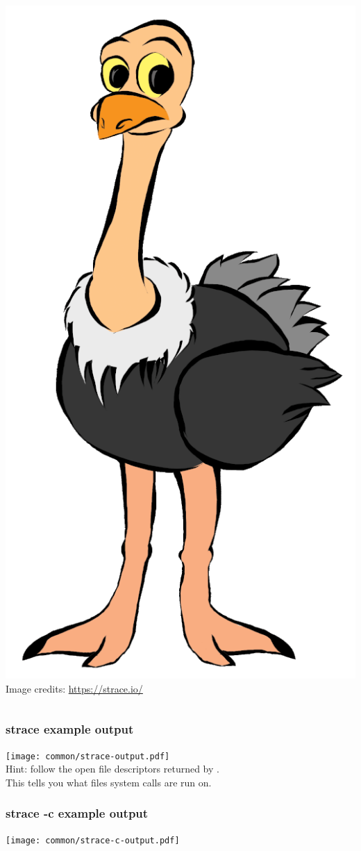 \begin{frame}[fragile]
\begin{columns}
  \includegraphics[height=0.7\textheight]{common/strace-mascot.png}\\
  \tiny Image credits: \url{https://strace.io/}
  \end{columns}
\end{frame}

\begin{frame}[fragile]
  \frametitle{strace example output}
  \texttt{[image: common/strace-output.pdf]}\\
  Hint: follow the open file descriptors returned by . \\
  This tells you what files system calls are run on.
\end{frame}

\begin{frame}[fragile]
  \frametitle{strace -c example output}
  \texttt{[image: common/strace-c-output.pdf]}
\end{frame}
